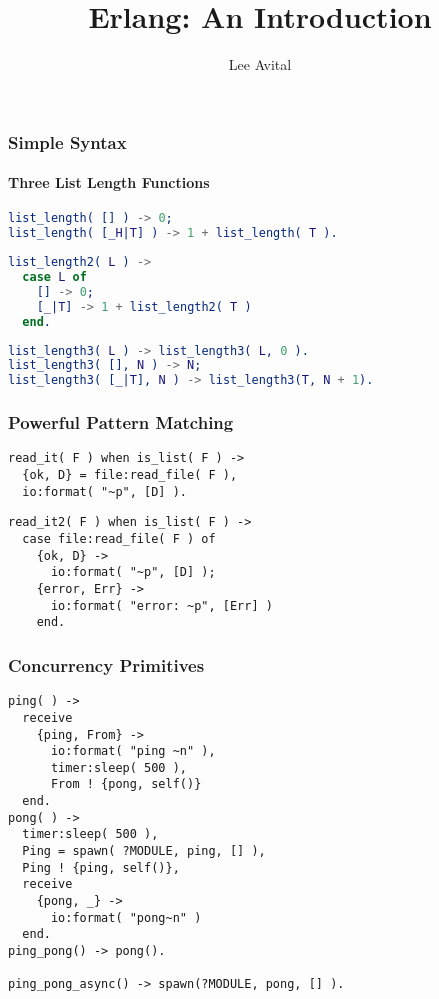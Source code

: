 \documentclass{beamer}
\title{Erlang: An Introduction}
\author{Lee Avital}
\begin{document}
\frame{\titlepage}


\begin{frame}[fragile]
  \frametitle{Simple Syntax}
  \framesubtitle{Three List Length Functions}
  \begin{lstlisting}[language=erlang]
list_length( [] ) -> 0;
list_length( [_H|T] ) -> 1 + list_length( T ).
  \end{lstlisting}

  \begin{lstlisting}[language=Erlang]
list_length2( L ) ->
  case L of
    [] -> 0;
    [_|T] -> 1 + list_length2( T )
  end.
  \end{lstlisting}


  \begin{lstlisting}[language=erlang]
list_length3( L ) -> list_length3( L, 0 ).
list_length3( [], N ) -> N;
list_length3( [_|T], N ) -> list_length3(T, N + 1).
  \end{lstlisting}
\end{frame}











\begin{frame}[fragile]
  \frametitle{Powerful Pattern Matching}
  \begin{lstlisting}
read_it( F ) when is_list( F ) ->
  {ok, D} = file:read_file( F ),
  io:format( "~p", [D] ).
  \end{lstlisting}

  \begin{lstlisting}
read_it2( F ) when is_list( F ) ->
  case file:read_file( F ) of
    {ok, D} ->
      io:format( "~p", [D] );
    {error, Err} ->
      io:format( "error: ~p", [Err] )
    end.
  \end{lstlisting}


\end{frame}




\begin{frame}[fragile]
    \frametitle{Concurrency Primitives}
    \begin{lstlisting}
ping( ) ->
  receive
    {ping, From} ->
      io:format( "ping ~n" ),
      timer:sleep( 500 ),
      From ! {pong, self()}
  end.
pong( ) ->
  timer:sleep( 500 ),
  Ping = spawn( ?MODULE, ping, [] ),
  Ping ! {ping, self()},
  receive
    {pong, _} ->
      io:format( "pong~n" )
  end.
ping_pong() -> pong().

ping_pong_async() -> spawn(?MODULE, pong, [] ).
    \end{lstlisting}

\end{frame}
\end{document}
